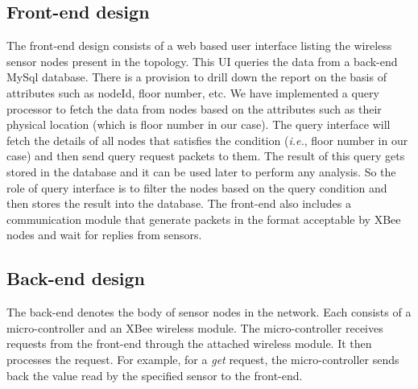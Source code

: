 \subsection{Front-end design}
The front-end design consists of a web based user interface listing the wireless sensor nodes present in the topology. This UI queries the data from a back-end MySql database. There is a provision to drill down the report on the basis of attributes such as nodeId, floor number, etc.
We have implemented a query processor to fetch the data from nodes based on the attributes such as their physical location (which is floor number in our case). The query interface will fetch the details of all nodes that satisfies the condition (\emph{i.e.}, floor number in our case) and then send query request packets to them. The result of this query gets stored in the database and it can be used later to perform any analysis. So the role of query interface is to filter the nodes based on the query condition and then stores the result into the database. The front-end also includes a communication module that generate packets in the format acceptable by XBee nodes and wait for replies from sensors.


\subsection{Back-end design}
The back-end denotes the body of sensor nodes in the network. Each consists of a micro-controller and an XBee wireless module. The micro-controller receives requests from the front-end through the attached wireless module. It then processes the request. For example, for a \emph{get} request, the micro-controller sends back the value read by the specified sensor to the front-end.

